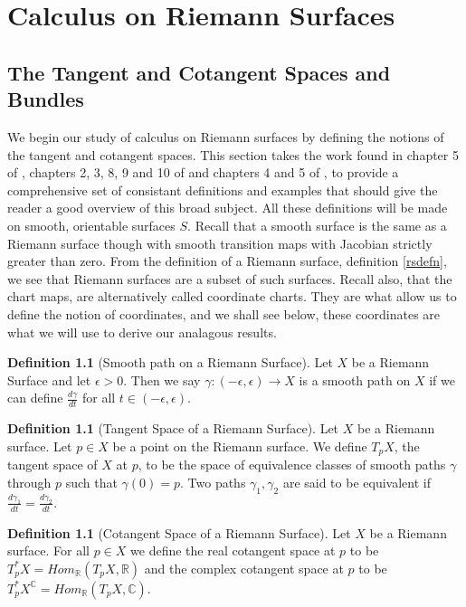 \documentclass[11pt]{report}
\theoremstyle{definition}
\newtheorem{defn}[thm]{Definition}
\begin{document}
\chapter{Calculus on Riemann Surfaces}

\section{The Tangent and Cotangent Spaces and Bundles}
We begin our study of calculus on Riemann surfaces by defining the notions of
the tangent and cotangent spaces. This section takes the work found in chapter 5 of \cite{donaldson}, chapters 2, 3, 8, 9 and 10 of \cite{calcohomo} and chapters 4 and 5 of \cite{spivak}, to provide a comprehensive set of consistant definitions and examples that should give the reader a good overview of this broad subject.
All these definitions will be made on smooth, orientable surfaces $S$. Recall that a smooth surface is the same as a Riemann surface though with smooth transition maps with Jacobian strictly greater than zero. From the definition of a Riemann surface, definition \ref{rsdefn}, we see that Riemann surfaces are a subset of such surfaces. Recall also, that the chart maps, are alternatively called coordinate charts. They are what allow us to define the notion of coordinates, and we shall see below, these coordinates are what we will use to derive our analagous results.

\begin{defn}[Smooth path on a Riemann Surface]\label{Smooth Path}
  Let $X$ be a Riemann Surface and let $\epsilon > 0$. Then we say
  $\gamma:(-\epsilon,\epsilon) \rightarrow X$ is a smooth path on $X$ if
  we can define $\frac{d\gamma}{dt}$ for all $t \in (-\epsilon,\epsilon)$.
\end{defn}

\begin{defn}[Tangent Space of a Riemann Surface]\label{TpX}
  Let $X$ be a Riemann surface. Let $p \in X$ be a point on the Riemann
  surface. We define $T_pX$, the tangent space of $X$ at
  $p$, to be the
  space of equivalence classes of smooth paths $\gamma$ through $p$ such
  that $\gamma(0)=p$. Two paths $\gamma_1, \gamma_2$ are said to be
  equivalent if $\frac{d\gamma_1}{dt}=\frac{d\gamma_2}{dt}$.
\end{defn}

\begin{defn}[Cotangent Space of a Riemann Surface]\label{T*pX}
  Let $X$ be a Riemann surface. For all $p \in X$ we define the real
  cotangent space at $p$ to be
  $T^*_pX = Hom_{\mathbb{R}}(T_pX, \mathbb{R})$ and the complex cotangent
  space at $p$ to be
  $T^*_pX^{\mathbb{C}} = Hom_{\mathbb{R}}(T_pX,\mathbb{C})$.
\end{defn}
\end{document}
